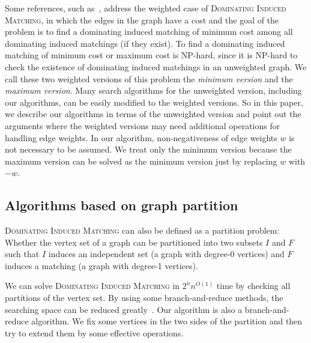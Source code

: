\documentclass{elsart_TR2}
\begin{document}
Some references, such as~\cite{LMS:DIMexact},  address the weighted case of \textsc{Dominating Induced Matching}, in which the edges in the graph have a cost and the goal of the problem is to find
a dominating induced matching of minimum cost among all dominating induced matchings (if they exist). To find a dominating induced matching of minimum cost or maximum cost is NP-hard, since it is NP-hard to check the existence of dominating induced matchings in an unweighted graph. We call these two weighted versions of this problem the \emph{minimum version} and the \emph{maximum version}. Many search algorithms for the unweighted version, including our algorithms, can be easily modified to the weighted versions. So in this paper, we describe our algorithms in terms of the unweighted version and point out the arguments where the weighted versions may need additional operations for handling edge weights.
In our algorithm, non-negativeness of edge weights $w$ is not necessary to be assumed.
We treat only the minimum version because  the maximum version can be solved
as the minimum version  just by replacing $w$ with $-w$.


\subsection{Algorithms based on graph partition}
\textsc{Dominating Induced Matching} can also be defined as a partition problem: Whether the vertex set of a graph can be partitioned into two subsets $I$ and $F$ such that
 $I$ induces an independent set (a graph with  degree-0 vertices) and
 $F$ induces a matching (a graph with   degree-1 vertices).



We can solve  \textsc{Dominating Induced Matching} in $2^nn^{O(1)}$ time by checking all partitions of the vertex set.
By using some branch-and-reduce methods, the searching space can be reduced greatly~\cite{LMS:DIMexact}.
Our algorithm is also a branch-and-reduce algorithm. We fix some vertices in the two sides of the partition and then try to extend them by some effective operations.
\end{document}
